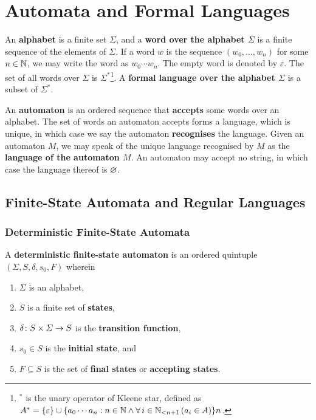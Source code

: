 


\usepackage{tikz}
\usetikzlibrary{automata,decorations.markings}
\newcommand*{\pt}{5mm}


\section{Automata and Formal Languages}

An {\bf alphabet} is a finite set \(\varSigma\), and a {\bf word over the
alphabet \(\varSigma\)} is a finite sequence of the elements of \(\varSigma\).
If a word \(w\) is the sequence \((w_0, \ldots, w_n)\) for some \(n \in
\setnat\), we may write the word as \(w_0 \cdots w_n\). The empty word is
denoted by \(\varepsilon\). The set of all words over \(\varSigma\) is
\(\varSigma^*\)\footnote{\(^*\) is the unary operator of Kleene star, defined as
\(A^* = \set{\varepsilon} \cup \set{a_0 \cdots a_n : n \in \setnat \land \forall
\, i \in \Nln[n + 1] \, (a_i \in A)}n\).}. A {\bf formal language over the
alphabet \(\varSigma\)} is a subset of \(\varSigma^*\).

An {\bf automaton} is an ordered sequence that {\bf accepts} some words over an
alphabet. The set of words an automaton accepts forms a language, which is
unique, in which case we say the automaton {\bf recognises} the language. Given
an automaton \(M\), we may speak of the unique language recognised by \(M\) as
the {\bf language of the automaton \(M\)}. An automaton may accept no string, in
which case the language thereof is \(\nset\).

\subsection{Finite-State Automata and Regular Languages}

\subsubsection{Deterministic Finite-State Automata}

\Bdf
    A {\bf deterministic finite-state automaton} is an ordered quintuple
    \((\varSigma, S, \delta, s_0, F)\) wherein
    \begin{enumerate}
        \item \(\varSigma\) is an alphabet,
        \item \(S\) is a finite set of {\bf states},
        \item \(\map{\delta}{S \times \varSigma}{S}\) is the {\bf transition
        function},
        \item \(s_0 \in S\) is the {\bf initial state}, and
        \item \(F \subseteq S\) is the set of {\bf final states} or {\bf
        accepting states}.
    \end{enumerate}
\Edf

